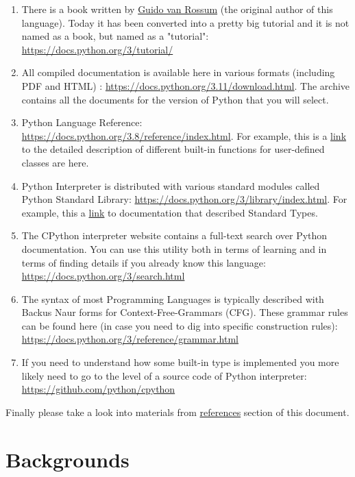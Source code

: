 \documentclass[
]{article}
\begin{document}
\begin{enumerate}
\def\labelenumi{\arabic{enumi}.}
\item
  There is a book written by
  \href{https://en.wikipedia.org/wiki/Guido_van_Rossum}{Guido van
  Rossum} (the original author of this language). Today it has been
  converted into a pretty big tutorial and it is not named as a book,
  but named as a "tutorial": \url{https://docs.python.org/3/tutorial/}
\item
  All compiled documentation is available here in various formats
  (including PDF and HTML) :
  \url{https://docs.python.org/3.11/download.html}. The archive contains
  all the documents for the version of Python that you will select.
\item
  Python Language Reference:
  \url{https://docs.python.org/3.8/reference/index.html}. For example,
  this is a
  \href{https://docs.python.org/3/reference/datamodel.html\#emulating-callable-objects}{link}
  to the detailed description of different built-in functions for
  user-defined classes are here.
\item
  Python Interpreter is distributed with various standard modules called
  Python Standard Library:
  \url{https://docs.python.org/3/library/index.html}. For example, this
  a \href{https://docs.python.org/3/library/stdtypes.html}{link} to
  documentation that described Standard Types.
\item
  The CPython interpreter website contains a full-text search over
  Python documentation. You can use this utility both in terms of
  learning and in terms of finding details if you already know this
  language: \url{https://docs.python.org/3/search.html}
\item
  The syntax of most Programming Languages is typically described with
  Backus Naur forms for Context-Free-Grammars (CFG). These grammar rules
  can be found here (in case you need to dig into specific construction
  rules): \url{https://docs.python.org/3/reference/grammar.html}
\item
  If you need to understand how some built-in type is implemented you
  more likely need to go to the level of a source code of Python
  interpreter: \url{https://github.com/python/cpython}
\end{enumerate}

Finally please take a look into materials from
\protect\hyperlink{references}{references} section of this document.

\hypertarget{backgrounds}{%
\section{Backgrounds}\label{backgrounds}}
\end{document}
